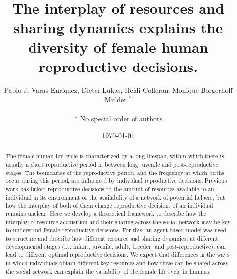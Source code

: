 \documentclass{article}
\title{The interplay of resources and sharing dynamics explains the diversity of female human reproductive decisions.}
\author{Pablo J. Varas Enriquez, Dieter Lukas, Heidi Colleran, Monique Borgerhoff Mulder $^*$\\\\
$*$ No special order of authors}
\date{\today}
\begin{document}
\maketitle

\begin{abstract}
    The female human life cycle is characterized by a long lifespan, within which there is usually a short reproductive period in between long juvenile and post-reproductive stages. The boundaries of the reproductive period, and the frequency at which births occur during this period, are influenced by individual reproductive decisions. Previous work has linked reproductive decisions to the amount of resources available to an individual in its environment or the availability of a network of potential helpers, but how the interplay of both of them change reproductive decisions of an individual remains unclear. Here we develop a theoretical framework to describe how the interplay of resource acquisition and their sharing across the social network may be key to understand female reproductive decisions. For this, an agent-based model was used to structure and describe how different resource and sharing dynamics, at different developmental stages (i.e. infant, juvenile, adult, breeder, and post-reproductive), can lead to different optimal reproductive decisions. We expect that differences in the ways in which individuals obtain different key resources and how these can be shared across the social network can explain the variability of the female life cycle in humans.
\end{abstract}
\end{document}
